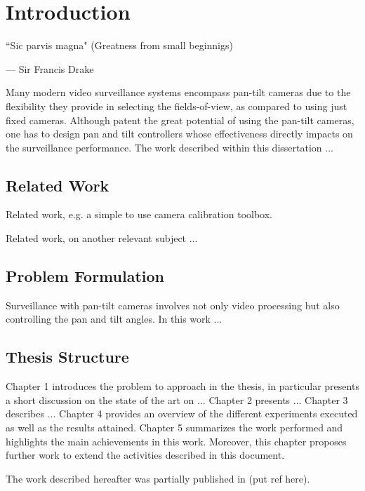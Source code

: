 \chapter{Introduction}

\epigraph{``Sic parvis magna" (Greatness from small beginnigs)}{--- \textup{Sir Francis Drake}}


Many modern video surveillance systems encompass pan-tilt cameras due to the flexibility they provide in selecting the fields-of-view, as compared to using just fixed cameras. Although patent the great potential of using the pan-tilt cameras, one has to design pan and tilt controllers whose effectiveness directly impacts on the surveillance performance.
%
The work described within this dissertation ...


\section{Related Work} 

Related work, e.g. a simple to use camera calibration toolbox.

Related work, on another relevant subject ...


\section{Problem Formulation} 


Surveillance with pan-tilt cameras involves not only video processing but also controlling the pan and tilt angles. In this work ...


\section{Thesis Structure} 

Chapter 1 introduces the problem to approach in the thesis, in particular presents a short discussion on the state of the art on ... 
%
Chapter 2 presents ...
%
Chapter 3 describes ...
%
Chapter 4 provides an overview of the different experiments executed as well as the results attained.
%
Chapter 5 summarizes the work performed and highlights the main achievements in this work. Moreover, this chapter proposes further work to extend the activities described in this document.

The work described hereafter was partially published in (put ref here).
